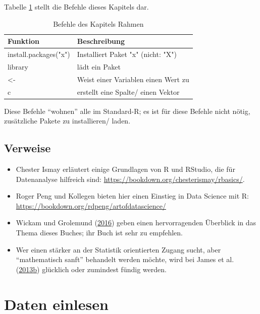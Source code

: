 \documentclass[12pt,ngerman,]{book}
\begin{document}
Tabelle \ref{tab:befehle-rahmen} stellt die Befehle dieses Kapitels dar.

\begin{table}

\caption{\label{tab:befehle-rahmen}Befehle des Kapitels Rahmen}
\centering
\begin{tabular}[t]{l|l}
\hline
Funktion & Beschreibung\\
\hline
install.packages("x") & Installiert Paket "x" (nicht: "X")\\
\hline
library & lädt ein Paket\\
\hline
<- & Weist einer Variablen einen Wert zu\\
\hline
c & erstellt eine Spalte/ einen Vektor\\
\hline
\end{tabular}
\end{table}

Diese Befehle ``wohnen'' alle im Standard-R; es ist für diese Befehle
nicht nötig, zusätzliche Pakete zu installieren/ laden.

\section{Verweise}\label{verweise}

\begin{itemize}
\item
  Chester Ismay erläutert einige Grundlagen von R und RStudio, die für
  Datenanalyse hilfreich sind:
  \url{https://bookdown.org/chesterismay/rbasics/}.
\item
  Roger Peng und Kollegen bieten hier einen Einstieg in Data Science mit
  R: \url{https://bookdown.org/rdpeng/artofdatascience/}
\item
  Wickam und Grolemund (\protect\hyperlink{ref-r4ds}{2016}) geben einen
  hervorragenden Überblick in das Thema dieses Buches; ihr Buch ist sehr
  zu empfehlen.
\item
  Wer einen stärker an der Statistik orientierten Zugang sucht, aber
  ``mathematisch sanft'' behandelt werden möchte, wird bei James et al.
  (\protect\hyperlink{ref-introstatlearning}{2013}\protect\hyperlink{ref-introstatlearning}{b})
  glücklich oder zumindest fündig werden.
\end{itemize}

\chapter{Daten einlesen}\label{daten-einlesen}
\end{document}

